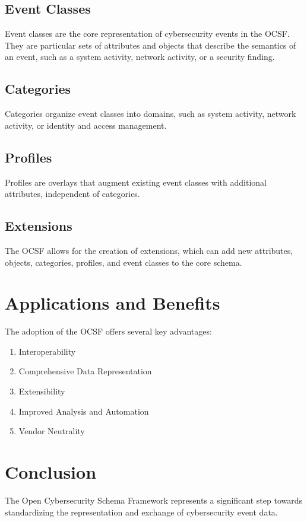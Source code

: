 \documentclass{article}
\begin{document}
\subsection{Event Classes}
Event classes are the core representation of cybersecurity events in the OCSF. They are particular sets of attributes and objects that describe the semantics of an event, such as a system activity, network activity, or a security finding.

\subsection{Categories}
Categories organize event classes into domains, such as system activity, network activity, or identity and access management.

\subsection{Profiles}
Profiles are overlays that augment existing event classes with additional attributes, independent of categories.

\subsection{Extensions}
The OCSF allows for the creation of extensions, which can add new attributes, objects, categories, profiles, and event classes to the core schema.

\section{Applications and Benefits}
The adoption of the OCSF offers several key advantages:

\begin{enumerate}
   \item Interoperability
   \item Comprehensive Data Representation
   \item Extensibility
   \item Improved Analysis and Automation
   \item Vendor Neutrality
\end{enumerate}

\section{Conclusion}
The Open Cybersecurity Schema Framework represents a significant step towards standardizing the representation and exchange of cybersecurity event data.
\end{document}
